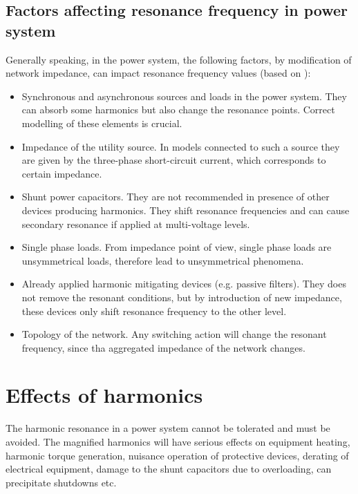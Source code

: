 \documentclass[12pt]{report} %
\begin{document}
\subsection{Factors affecting resonance frequency in power system}
Generally speaking, in the power system, the following factors, by modification of network impedance, can impact resonance frequency values (based on \cite{das}):
\begin{itemize}
	\item Synchronous and asynchronous sources and loads in the power system. They can absorb some harmonics but also change the resonance points. Correct modelling of these elements is crucial.
	\item Impedance of the utility source. In models connected to such a source they are given by the three-phase short-circuit current, which corresponds to certain impedance.
	\item Shunt power capacitors. They are not recommended in presence of other devices producing harmonics. They shift resonance frequencies and can cause secondary resonance if applied at multi-voltage levels.
	\item Single phase loads. From impedance point of view, single phase loads are unsymmetrical loads, therefore lead to unsymmetrical phenomena.
	\item Already applied harmonic mitigating devices (e.g. passive filters). They does not remove the resonant conditions, but by introduction of new impedance, these devices only shift resonance frequency to the other level.
	\item Topology of the network. Any switching action will change the resonant frequency, since tha aggregated impedance of the network changes. 
\end{itemize}

\section{Effects of harmonics} \label{effectsofharmonics}
The harmonic resonance in a power system cannot be tolerated and must be avoided. The magnified harmonics will have serious effects on equipment heating, harmonic torque generation, nuisance operation of protective devices, derating of electrical equipment, damage to the shunt capacitors due to overloading, can precipitate shutdowns etc.
\end{document}
